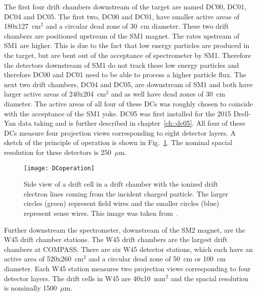 The first four drift chambers downstream of the target are named DC00, DC01,
DC04 and DC05.  The first two, DC00 and DC01, have smaller active areas of
180x127~cm$^2$ and a circular dead zone of 30~cm diameter.  These two drift
chambers are positioned upstream of the SM1 magnet.  The rates upstream of SM1
are higher.  This is due to the fact that low energy particles are produced in
the target, but are bent out of the acceptance of spectrometer by SM1.
Therefore the detectors downstream of SM1 do not track these low energy
particles and therefore DC00 and DC01 need to be able to process a higher
particle flux.  The next two drift chambers, DC04 and DC05, are downstream of
SM1 and both have larger active areas of 240x204~cm$^2$ and as well have dead
zones of 30~cm diameter.  The active areas of all four of these DCs was roughly
chosen to coincide with the acceptance of the SM1 yoke.  DC05 was first
installed for the 2015 Drell-Yan data taking and is further described in
chapter~\ref{ch::dc05}.  All four of these DCs measure four projection views
corresponding to eight detector layers.  A sketch of the principle of operation
is shown in Fig.~\ref{fig::DCoperation}.  The nominal spacial resolution for
these detectors is 250~$\mu$m. \par

\begin{figure}[h!t]
  \centering
  \texttt{[image: DCoperation]}
  \caption{Side view of a drift cell in a drift chamber with the ionized drift
    electron lines coming from the incident charged particle.  The larger
    circles (green) represent field wires and the smaller circles (blue)
    represent sense wires.  This image was taken from~\cite{compassSpec}.}
  \label{fig::DCoperation}
\end{figure}

Further downstream the spectrometer, downstream of the SM2 magnet, are the W45
drift chamber stations.  The W45 drift chambers are the largest drift chambers
at COMPASS.  There are six W45 detector stations, which each have an active area
of 520x260~cm$^2$ and a circular dead zone of 50~cm or 100~cm diameter.  Each
W45 station measures two projection views corresponding to four detector layers.
The drift cells in W45 are 40x10~mm$^2$ and the spacial resolution is nominally
1500~$\mu$m. \par

